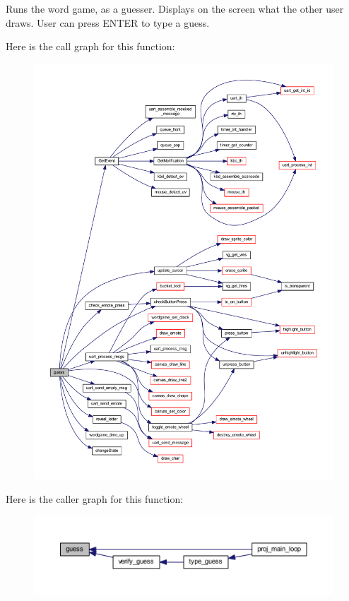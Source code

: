 Runs the word game, as a guesser. Displays on the screen what the other user draws. User can press E\+N\+T\+ER to type a guess. 

Here is the call graph for this function\+:
\nopagebreak
\begin{figure}[H]
\begin{center}
\leavevmode
\includegraphics[width=350pt]{group__pengoo_ga089d0f37444b1b486cf98045a512deed_cgraph}
\end{center}
\end{figure}
Here is the caller graph for this function\+:\nopagebreak
\begin{figure}[H]
\begin{center}
\leavevmode
\includegraphics[width=350pt]{group__pengoo_ga089d0f37444b1b486cf98045a512deed_icgraph}
\end{center}
\end{figure}
\mbox{\label{group__pengoo_ga476146a203654a545a8493d3ebeaaf70}} 
